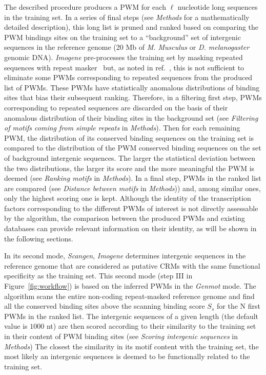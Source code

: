 \documentclass[a4,center,fleqn]{NAR}
\begin{document}
The described procedure produces a PWM for each $\ell$ nucleotide long
sequences in the training set.
In a series of final steps (see {\em Methods} for a mathematically detailed
description), this long list is pruned and ranked based on comparing the PWM
bindings sites on the training set to a ``background'' set of intergenic
sequences in the reference genome (20 Mb of {\em M. Musculus}  or {\em D.
melanogaster} genomic DNA).
{\em Imogene} pre-processes the training set by masking repeated sequences with
repeat masker~\cite{bao2002automated} but, as noted in
ref.~\cite{Rouault:2010fk}, this is not sufficient to eliminate some PWMs
corresponding to repeated sequences from the produced list of PWMs. 
These PWMs have statistically anomalous distributions of binding sites that bias
their subsequent ranking.
Therefore, in a  filtering first step, PWMs corresponding to repeated sequences
are discarded on the basis of their anomalous distribution of their binding
sites in the background set (see {\em Filtering of motifs coming from simple
repeats} in {\em Methods}).
Then for each remaining  PWM, the distribution of its  conserved binding
sequences on the training set is compared to the distribution of the PWM
conserved binding sequences on the set of background intergenic sequences.
The larger the statistical deviation between the two distributions, the larger
its score and the more meaningful the PWM is deemed (see {\em Ranking motifs}
in {\em Methods}).
In a final step, PWMs in the ranked list are compared (see {\em Distance
between  motifs} in {\em Methods})) and, among similar ones, only the highest
scoring one is kept.
Although the identity of the transcription factors corresponding to the
different PWMs of interest is not directly assessable by the algorithm, the
comparison between the produced PWMs and existing databases  can provide
relevant information on their identity, as will be shown in the following
sections. 

In its second mode, {\em Scangen}, {\em Imogene} determines intergenic
sequences in the reference genome that are considered as putative CRMs with the
same functional specificity as the training set.
This second mode (step III in Figure~\ref{fig:workflow}) is  based on the
inferred PWMs in the {\em Genmot} mode.
The algorithm scans the entire non-coding repeat-masked reference genome and
find all the conserved binding sites above the scanning binding score $S_s$ for
the N first  PWMs in the ranked list.
The intergenic sequences of a given length (the default value is $1000$ nt) are
then scored according to their similarity to the training set in their content
of PWM binding sites (see {\em Scoring intergenic sequences} in {\em Methods})
The closest the similarity in its motif content with the training set, the most
likely an intergenic sequences is deemed to be functionally related to the
training set.
\end{document}
